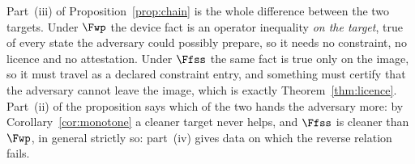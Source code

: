 
Part~(iii) of Proposition~\ref{prop:chain} is the whole difference between the
two targets. Under $\Fwp$ the device fact is an operator inequality \emph{on
the target}, true of every state the adversary could possibly prepare, so it
needs no constraint, no licence and no attestation. Under $\Ffss$ the same
fact is true only on the image, so it must travel as a declared constraint
entry, and something must certify that the adversary cannot leave the image,
which is exactly Theorem~\ref{thm:licence}. Part~(ii) of the proposition says
which of the two hands the adversary more: by Corollary~\ref{cor:monotone} a
cleaner target never helps, and $\Ffss$ is cleaner than $\Fwp$, in general
strictly so: part~(iv) gives data on which the reverse relation fails.

